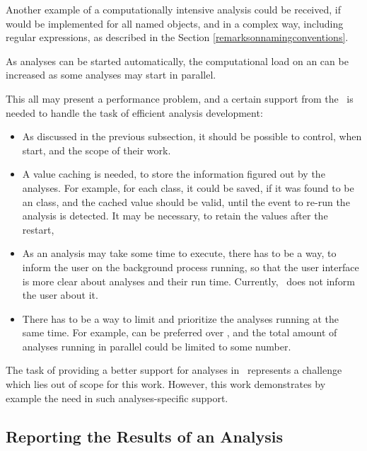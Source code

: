 Another example of a computationally intensive analysis could be received, if   would
be implemented for all named objects, and in a complex way, including regular expressions, as described in the Section \ref{remarksonnamingconventions}.

As analyses can be started automatically, the computational load on an  can be increased as some analyses
may start in parallel. 

This all may present a performance problem, and a certain support from the \jbmps\ is needed to handle the task
of efficient analysis development:

\begin{itemize}
 \item As discussed in the previous subsection, it should be possible to control, when  start,
and the scope of their work. 


\item A value caching is needed, to store the information figured out by the analyses. For example, for each
class, it could be saved, if it was found to be an  class, and the cached value should be valid, until
the event to re-run the analysis is detected. It may be necessary, to retain the values after the  restart,

 \item As an analysis may take some time to execute, there has to be a way, to inform the user on the background process
running, so that the user interface is more clear about analyses and their run time. Currently, \jbmps\ does not inform
the user about it.

\item There has to be a way to limit and prioritize the analyses running at the same time. For example, 
can be preferred over , and the total amount of analyses running in parallel could be limited 
to some number.

\end{itemize}

The task of providing a better support for analyses in \jbmps\ represents a challenge which lies out of scope for this work.
However, this work demonstrates by example the need in such analyses-specific support.

\subsection{Reporting the Results of an Analysis}
\label{reportinganalysis}

